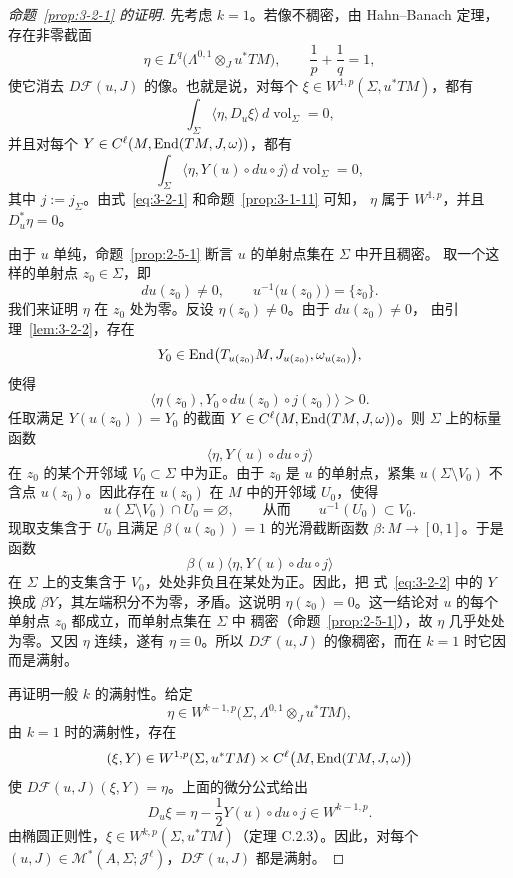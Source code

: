 \begin{proof}[命题~\ref{prop:3-2-1} 的证明]
先考虑 $k=1$。若像不稠密，由 Hahn--Banach 定理，存在非零截面
\[
  \eta\in L^q\bigl(\Lambda^{0,1}\otimes_Ju^*TM\bigr),
  \qquad \frac1p+\frac1q=1,
\]
使它消去 $D\mathcal F(u,J)$ 的像。也就是说，对每个
$\xi\in W^{1,p}(\Sigma,u^*TM)$，都有
\begin{equation}\label{eq:3-2-1}
  \int_\Sigma\langle\eta,D_u\xi\rangle\,
  d\operatorname{vol}_\Sigma=0,
\end{equation}
并且对每个 $Y\in C^\ell(M,\operatorname{End}(TM,J,\omega))$，都有
\begin{equation}\label{eq:3-2-2}
  \int_\Sigma
  \langle\eta,Y(u)\circ du\circ j\rangle\,
  d\operatorname{vol}_\Sigma=0,
\end{equation}
其中 $j:=j_\Sigma$。由式~\eqref{eq:3-2-1} 和命题~\ref{prop:3-1-11} 可知，
$\eta$ 属于 $W^{1,p}$，并且 $D_u^*\eta=0$。

由于 $u$ 单纯，命题~\ref{prop:2-5-1} 断言 $u$ 的单射点集在 $\Sigma$ 中开且稠密。
取一个这样的单射点 $z_0\in\Sigma$，即
\[
  du(z_0)\ne0,
  \qquad
  u^{-1}\bigl(u(z_0)\bigr)=\{z_0\}.
\]
我们来证明 $\eta$ 在 $z_0$ 处为零。反设 $\eta(z_0)\ne0$。由于 $du(z_0)\ne0$，
由引理~\ref{lem:3-2-2}，存在
\[
  Y_0\in\operatorname{End}\bigl(T_{u(z_0)}M,J_{u(z_0)},\omega_{u(z_0)}\bigr),
\]
使得
\[
  \bigl\langle\eta(z_0),
  Y_0\circ du(z_0)\circ j(z_0)\bigr\rangle>0.
\]
任取满足 $Y(u(z_0))=Y_0$ 的截面
$Y\in C^\ell(M,\operatorname{End}(TM,J,\omega))$。则 $\Sigma$ 上的标量函数
\[
  \langle\eta,Y(u)\circ du\circ j\rangle
\]
在 $z_0$ 的某个开邻域 $V_0\subset\Sigma$ 中为正。由于 $z_0$ 是 $u$ 的单射点，紧集
$u(\Sigma\setminus V_0)$ 不含点 $u(z_0)$。因此存在 $u(z_0)$ 在 $M$ 中的开邻域
$U_0$，使得
\[
  u(\Sigma\setminus V_0)\cap U_0=\varnothing,
  \qquad\text{从而}\qquad
  u^{-1}(U_0)\subset V_0.
\]
现取支集含于 $U_0$ 且满足 $\beta(u(z_0))=1$ 的光滑截断函数
$\beta:M\to[0,1]$。于是函数
\[
  \beta(u)\langle\eta,Y(u)\circ du\circ j\rangle
\]
在 $\Sigma$ 上的支集含于 $V_0$，处处非负且在某处为正。因此，把
式~\eqref{eq:3-2-2} 中的 $Y$ 换成 $\beta Y$，其左端积分不为零，矛盾。这说明
$\eta(z_0)=0$。这一结论对 $u$ 的每个单射点 $z_0$ 都成立，而单射点集在 $\Sigma$ 中
稠密（命题~\ref{prop:2-5-1}），故 $\eta$ 几乎处处为零。又因 $\eta$ 连续，遂有
$\eta\equiv0$。所以 $D\mathcal F(u,J)$ 的像稠密，而在 $k=1$ 时它因而是满射。

再证明一般 $k$ 的满射性。给定
\[
  \eta\in W^{k-1,p}\bigl(\Sigma,
  \Lambda^{0,1}\otimes_Ju^*TM\bigr),
\]
由 $k=1$ 时的满射性，存在
\[
  (\xi,Y)\in W^{1,p}(\Sigma,u^*TM)
  \times C^\ell\bigl(M,\operatorname{End}(TM,J,\omega)\bigr)
\]
使 $D\mathcal F(u,J)(\xi,Y)=\eta$。上面的微分公式给出
\[
  D_u\xi=\eta-\frac12Y(u)\circ du\circ j\in W^{k-1,p}.
\]
由椭圆正则性，$\xi\in W^{k,p}(\Sigma,u^*TM)$（定理 C.2.3）。因此，对每个
$(u,J)\in\mathcal M^*(A,\Sigma;\mathcal J^\ell)$，$D\mathcal F(u,J)$ 都是满射。


\end{proof}

